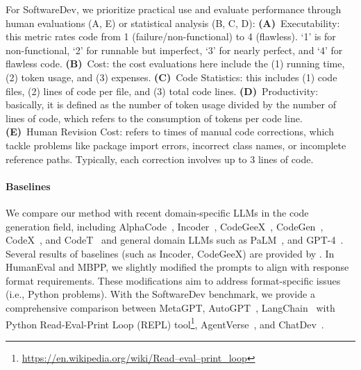 For SoftwareDev, we prioritize practical use and evaluate performance through human evaluations (A, E) or statistical analysis (B, C, D): 
\textbf{(A)}~Executability: this metric rates code from 1 (failure/non-functional) to 4 (flawless). 
%
`1' is for non-functional, `2' for runnable but imperfect, `3' for nearly perfect, and `4' for flawless code.
%
\textbf{(B)}~Cost: the cost evaluations here include the (1) running time, (2) token usage, and (3) expenses. 
%
\textbf{(C)}~Code Statistics: this includes (1) code files, (2) lines of code per file, and (3) total code lines. 
%
\textbf{(D)}~Productivity: basically, it is defined as the number of token usage divided by the number of lines of code, which refers to the consumption of tokens per code line.
%
\textbf{(E)}~Human Revision Cost: 
refers to times of manual code corrections, which tackle problems like package import errors, incorrect class names, or incomplete reference paths. Typically, each correction involves up to 3 lines of code.

\paragraph{Baselines}
We compare our method with recent domain-specific LLMs in the code generation field, including AlphaCode~\citep{li2022competition}, Incoder~\citep{fried2022incoder}, CodeGeeX~\citep{zheng2023codegeex}, CodeGen~\citep{nijkamp2023codegen}, CodeX~\citep{chen2021evaluating}, and CodeT~\citep{chen2022codet} and general domain LLMs such as PaLM~\citep{chowdhery2022palm}, and GPT-4~\citep{openai2023gpt4}. Several results of baselines (such as Incoder, CodeGeeX) are provided by \citet{dong2023self}. 
%
In HumanEval and MBPP, we slightly modified the prompts to align with response format requirements. These modifications aim to address format-specific issues (i.e., Python problems).
With the SoftwareDev benchmark, we provide a comprehensive comparison between MetaGPT, AutoGPT~\citep{autogpt_github}, LangChain~\citep{Chase_LangChain_2022} with Python Read-Eval-Print Loop (REPL) tool\footnote{\href{https://en.wikipedia.org/wiki/Read–eval–print\_loop}{https://en.wikipedia.org/wiki/Read–eval–print\_loop}}, AgentVerse~\citep{agentverse_github}, and ChatDev~\citep{qian2023communicative}. 


